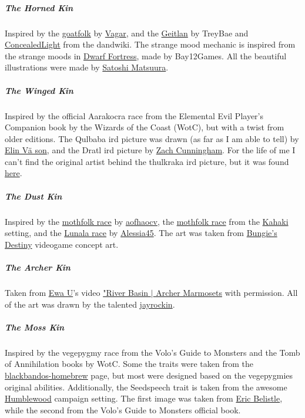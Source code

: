     \subparagraph{The Horned Kin} Inspired by the \href{https://homebrewery.naturalcrit.com/share/BksGVG27b}{goatfolk} by \href{https://www.reddit.com/user/Vagar/}{Vagar}, and the \href{https://www.dandwiki.com/wiki/Geitlan_(5e_Race)}{Geitlan} by TreyBae and \href{https://www.dandwiki.com/wiki/User:ConcealedLight}{ConcealedLight} from the dandwiki.
    The strange mood mechanic is inspired from the strange moods in \href{http://www.bay12games.com/dwarves/}{Dwarf Fortress}, made by Bay12Games.
    All the beautiful illustrations were made by \href{https://www.artstation.com/hiziripro}{Satoshi Matsuura}.

    \subparagraph{The Winged Kin} Inspired by the official Aarakocra race from the Elemental Evil Player's Companion book by the Wizards of the Coast (WotC), but with a twist from older editions.
    The Qulbaba ird picture was drawn (as far as I am able to tell) by \href{https://www.artstation.com/elinvason}{Elin V\"a son}, and the Dratl ird picture by \href{https://zachcunninghamart.weebly.com/}{Zach Cunningham}.
    For the life of me I can't find the original artist behind the thulkraka ird picture, but it was found \href{https://www.pinterest.com.au/pin/772859986026889236/?nic_v1=1aMPfjrcEzGBNwm803q3V1cypforv8WVbZ4jUXYP9aDqcJFyrfUt0Ww9rAOEq3SPSw}{here}.

    \subparagraph{The Dust Kin} Inspired by the \href{https://drive.google.com/file/d/1M200-YKAbl-nOLo52W--gkXVO6QpmihE/view}{mothfolk race} by \href{https://twitter.com/aofhaocv}{aofhaocv}, the \href{http://volthorne.wikidot.com/kahakai:races}{mothfolk race} from the \href{http://volthorne.wikidot.com/kahakai}{Kahaki} setting, and the \href{https://drive.google.com/file/d/1hxPW6VRRlcWuK9ukljLCO3ORSNlonwm1/view}{Lunala race} by \href{https://www.reddit.com/user/Alessia45/}{Alessia45}.
    The art was taken from \href{https://www.bungie.net/}{Bungie's Destiny} videogame concept art.

    \subparagraph{The Archer Kin} Taken from \href{https://www.youtube.com/channel/UCncTjqw75krp9j_wRRh5Gvw}{Ewa U}'s video \href{https://www.youtube.com/watch?v=_XCqpZwm39Q}{"River Basin $\mid$ Archer Marmosets} with permission.
    All of the art was drawn by the talented \href{https://jayrockin.tumblr.com/}{jayrockin}.

    \subparagraph{The Moss Kin} Inspired by the vegepygmy race from the Volo's Guide to Monsters and the Tomb of Annihilation books by WotC.
    Some the traits were taken from the \href{https://blackbandos-homebrew.fandom.com/wiki/Vegepygmy_(5e_Race)}{blackbandos-homebrew} page, but most were designed based on the vegepygmies original abilities.
    Additionally, the Seedspeech trait is taken from the awesome \href{https://thedeckofmany.com/collections/humblewood}{Humblewood} campaign setting.
    The first image was taken from \href{http://ericbelisle.com/}{Eric Belistle}, while the second from the Volo's Guide to Monsters official book.

